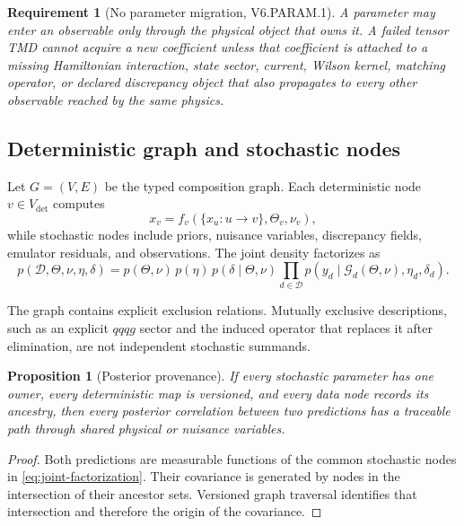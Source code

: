 \documentclass[11pt]{article}
\newtheorem{requirement}[definition]{Requirement}
\newtheorem{proposition}[definition]{Proposition}
\newcommand{\cG}{\mathcal G}
\newcommand{\allData}{\mathcal D}
\begin{document}
\begin{requirement}[No parameter migration, V6.PARAM.1]
A parameter may enter an observable only through the physical object that owns
it.  A failed tensor TMD cannot acquire a new coefficient unless that
coefficient is attached to a missing Hamiltonian interaction, state sector,
current, Wilson kernel, matching operator, or declared discrepancy object that
also propagates to every other observable reached by the same physics.
\end{requirement}

\subsection{Deterministic graph and stochastic nodes}

Let \(G=(V,E)\) be the typed composition graph.  Each deterministic node
\(v\in V_{\det}\) computes
\begin{equation}
 x_v=f_v\left(\{x_u:u\to v\},\Theta_v,\nu_v\right),
 \label{eq:det-node}
\end{equation}
while stochastic nodes include priors, nuisance variables, discrepancy fields,
emulator residuals, and observations.  The joint density factorizes as
\begin{equation}
 p(\allData,\Theta,\nu,\eta,\delta)
 =
 p(\Theta,\nu)\,
 p(\eta)\,
 p(\delta\mid\Theta,\nu)
 \prod_{d\in\allData}
 p\!\left(
 y_d\mid
 \cG_d(\Theta,\nu),\eta_d,\delta_d
 \right).
 \label{eq:joint-factorization}
\end{equation}

The graph contains explicit exclusion relations.  Mutually exclusive
descriptions, such as an explicit \(qqqg\) sector and the induced operator that
replaces it after elimination, are not independent stochastic summands.

\begin{proposition}[Posterior provenance]
If every stochastic parameter has one owner, every deterministic map is
versioned, and every data node records its ancestry, then every posterior
correlation between two predictions has a traceable path through shared
physical or nuisance variables.
\end{proposition}

\begin{proof}
Both predictions are measurable functions of the common stochastic nodes in
\cref{eq:joint-factorization}.  Their covariance is generated by nodes in the
intersection of their ancestor sets.  Versioned graph traversal identifies
that intersection and therefore the origin of the covariance.
\end{proof}
\end{document}
